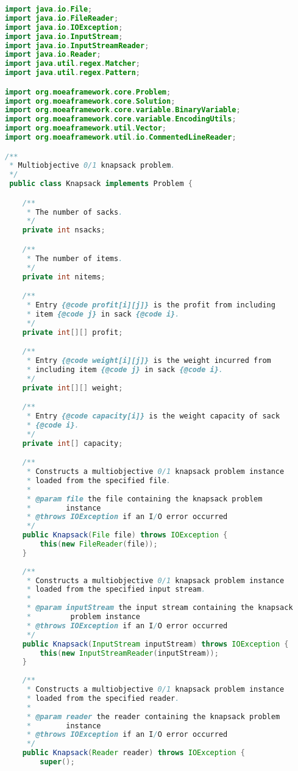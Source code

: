 \begin{lstlisting}[language=Java]
import java.io.File;
import java.io.FileReader;
import java.io.IOException;
import java.io.InputStream;
import java.io.InputStreamReader;
import java.io.Reader;
import java.util.regex.Matcher;
import java.util.regex.Pattern;

import org.moeaframework.core.Problem;
import org.moeaframework.core.Solution;
import org.moeaframework.core.variable.BinaryVariable;
import org.moeaframework.core.variable.EncodingUtils;
import org.moeaframework.util.Vector;
import org.moeaframework.util.io.CommentedLineReader;

/**
 * Multiobjective 0/1 knapsack problem.
 */
 public class Knapsack implements Problem {

	/**
	 * The number of sacks.
	 */
	private int nsacks;

	/**
	 * The number of items.
	 */
	private int nitems;

	/**
	 * Entry {@code profit[i][j]} is the profit from including
	 * item {@code j} in sack {@code i}.
	 */
	private int[][] profit;

	/**
	 * Entry {@code weight[i][j]} is the weight incurred from
	 * including item {@code j} in sack {@code i}.
	 */
	private int[][] weight;

	/**
	 * Entry {@code capacity[i]} is the weight capacity of sack
	 * {@code i}.
	 */
	private int[] capacity;

	/**
	 * Constructs a multiobjective 0/1 knapsack problem instance
	 * loaded from the specified file.
	 * 
	 * @param file the file containing the knapsack problem
	 *        instance
	 * @throws IOException if an I/O error occurred
	 */
	public Knapsack(File file) throws IOException {
		this(new FileReader(file));
	}
	
	/**
	 * Constructs a multiobjective 0/1 knapsack problem instance
	 * loaded from the specified input stream.
	 * 
	 * @param inputStream the input stream containing the knapsack
	 *         problem instance
	 * @throws IOException if an I/O error occurred
	 */
	public Knapsack(InputStream inputStream) throws IOException {
		this(new InputStreamReader(inputStream));
	}
	
	/**
	 * Constructs a multiobjective 0/1 knapsack problem instance
	 * loaded from the specified reader.
	 * 
	 * @param reader the reader containing the knapsack problem
	 *        instance
	 * @throws IOException if an I/O error occurred
	 */
	public Knapsack(Reader reader) throws IOException {
		super();
		

\end{lstlisting}
